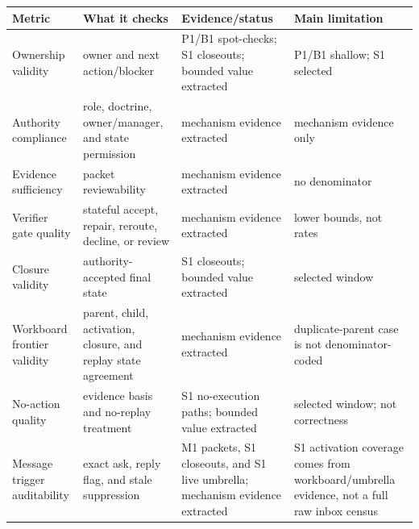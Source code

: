 \documentclass[
]{article}
\newcounter{none} %
\begin{document}
{\def\LTcaptype{none} %
\begin{longtable}[]{@{}
  >{\raggedright\arraybackslash}p{}
  >{\raggedright\arraybackslash}p{}
  >{\raggedright\arraybackslash}p{}
  >{\raggedright\arraybackslash}p{}@{}}
\toprule\noalign{}
\begin{minipage}[b]{\linewidth}\raggedright
Metric
\end{minipage} & \begin{minipage}[b]{\linewidth}\raggedright
What it checks
\end{minipage} & \begin{minipage}[b]{\linewidth}\raggedright
Evidence/status
\end{minipage} & \begin{minipage}[b]{\linewidth}\raggedright
Main limitation
\end{minipage} \\
\midrule\noalign{}
\endhead
\bottomrule\noalign{}
\endlastfoot
Ownership validity & owner and next action/blocker & P1/B1 spot-checks; S1 closeouts; bounded value extracted & P1/B1 shallow; S1 selected \\
Authority compliance & role, doctrine, owner/manager, and state permission & mechanism evidence extracted & mechanism evidence only \\
Evidence sufficiency & packet reviewability & mechanism evidence extracted & no denominator \\
Verifier gate quality & stateful accept, repair, reroute, decline, or review & mechanism evidence extracted & lower bounds, not rates \\
Closure validity & authority-accepted final state & S1 closeouts; bounded value extracted & selected window \\
Workboard frontier validity & parent, child, activation, closure, and replay state agreement & mechanism evidence extracted & duplicate-parent case is not denominator-coded \\
No-action quality & evidence basis and no-replay treatment & S1 no-execution paths; bounded value extracted & selected window; not correctness \\
Message trigger auditability & exact ask, reply flag, and stale suppression & M1 packets, S1 closeouts, and S1 live umbrella; mechanism evidence extracted & S1 activation coverage comes from workboard/umbrella evidence, not a full raw inbox census \\

\end{longtable}}
\end{document}
